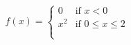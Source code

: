\documentclass[preview]{standalone}
\begin{document}
\begin{align*}
f(x) = \begin{cases} 0 & \text{if } x < 0 \\[6pt] x^2 & \text{if } 0 \leq x \leq 2 \\[6pt] & \text{ } \\ & \text{ } \end{cases}
\end{align*}
\end{document}
